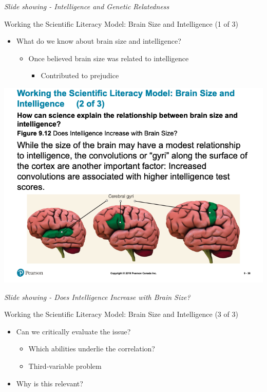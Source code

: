 \documentclass[
]{book}
\providecommand{\tightlist}{%
  \setlength{\itemsep}{0pt}\setlength{\parskip}{0pt}}
\begin{document}
\begin{reflect}
\emph{Slide showing - Intelligence and Genetic Relatedness}

Working the Scientific Literacy Model: Brain Size and Intelligence (1 of 3)

\begin{itemize}
\tightlist
\item
  What do we know about brain size and intelligence?

  \begin{itemize}
  \tightlist
  \item
    Once believed brain size was related to intelligence

    \begin{itemize}
    \tightlist
    \item
      Contributed to prejudice
    \end{itemize}
  \end{itemize}
\end{itemize}

\includegraphics{assets/unit_2/slide_38.png}

\emph{Slide showing - Does Intelligence Increase with Brain Size?}

Working the Scientific Literacy Model: Brain Size and Intelligence (3 of 3)

\begin{itemize}
\tightlist
\item
  Can we critically evaluate the issue?

  \begin{itemize}
  \tightlist
  \item
    Which abilities underlie the correlation?\\
  \item
    Third-variable problem
  \end{itemize}
\item
  Why is this relevant?


\end{itemize}
\end{reflect}
\end{document}
